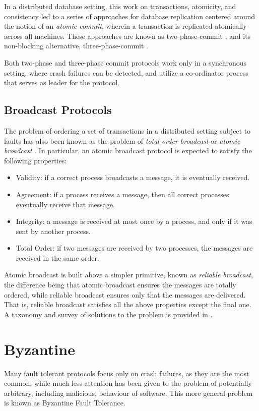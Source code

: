 In a distributed database setting, this work on transactions, atomicity, and consistency
led to a series of approaches for database replication centered around the notion of an \emph{atomic commit},
wherein a transaction is replicated atomically across all machines.
These approaches are known as two-phase-commit \cite{gray1978notes}, and its non-blocking alternative,
three-phase-commit \cite{skeen1983formal}.

Both two-phase and three-phase commit protocols work only in a synchronous setting,
where crash failures can be detected, and utilize a co-ordinator process that serves as leader for the protocol.

\subsection{Broadcast Protocols}

The problem of ordering a set of transactions in a distributed setting subject to faults has also been known as 
the problem of \emph{total order broadcast} or \emph{atomic broadcast} \cite{defago2004total}.
In particular, an atomic broadcast protocol is expected to satisfy the following properties:

\begin{itemize}
\item{Validity}: if a correct process broadcasts a message, it is eventually received.
\item{Agreement}: if a process receives a message, then all correct processes eventually receive that message.
\item{Integrity}: a message is received at most once by a process, and only if it was sent by another process.
\item{Total Order}: if two messages are received by two processes, the messages are received in the same order.
\end{itemize}

Atomic broadcast is built above a simpler primitive, known as \emph{reliable broadcast}, 
the difference being that atomic broadcast ensures the messages are totally ordered,
while reliable broadcast ensures only that the messages are delivered.
That is, reliable broadcast satisfies all the above properties except the final one.
A taxonomy and survey of solutions to the problem is provided in \cite{defago2004total}.

\section{Byzantine}
Many fault tolerant protocols focus only on crash failures, as they are the most common,
while much less attention has been given to the problem of potentially arbitrary, including malicious,
behaviour of software. This more general problem is known as Byzantine Fault Tolerance.

